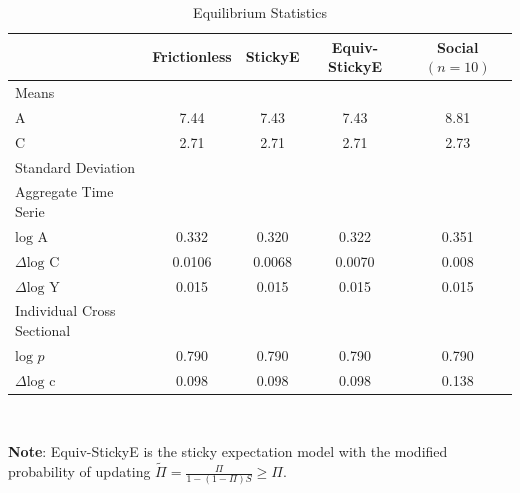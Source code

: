 \documentclass[12pt,letterpaper]{article}
\begin{document}
\begin{table}
	\centering
	\caption{Equilibrium Statistics}
	\label{tab:Uncert}
	\begin{center}
		\begin{tabular}{ l c c c c}\noalign{\hrule height 2pt}
			~ & Frictionless & StickyE & Equiv-StickyE & Social $(n=10)$\\
			\hline
			Means\\ 
			\hspace{6mm}$\mathrm{A}$ & 7.44 & 7.43 & 7.43 & 8.81\\
			\hspace{6mm}$\mathrm{C}$ & 2.71 & 2.71 & 2.71 & 2.73\\
			\hline
			Standard Deviation\\
			\hspace{3mm}Aggregate Time Serie\\
			\hspace{6mm}$\text{log }\mathrm{A}$ & 0.332 & 0.320 & 0.322 & 0.351\\
			\hspace{6mm}$\Delta \text{log }\mathrm{C}$ & 0.0106 & 0.0068 & 0.0070 & 0.008\\
			\hspace{6mm}$\Delta \text{log }\mathrm{Y}$ & 0.015 & 0.015 & 0.015 & 0.015\\
			\hspace{3mm}Individual Cross Sectional\\
			\hspace{6mm}$\text{log }p$ & 0.790 & 0.790 & 0.790& 0.790\\
			\hspace{6mm}$\Delta \text{log }\pmb{\mathrm{c}}$ & 0.098 & 0.098 & 0.098 & 0.138\\									
			\hline
		\end{tabular}
		\\
	\end{center}
	\begin{tablenotes}
		\small
		\item \textbf{Note}: Equiv-StickyE is the sticky expectation model with the modified probability of updating $\tilde{\Pi}=\frac{\Pi}{1-\left(1-\Pi\right)S}\geq\Pi$.
	\end{tablenotes}
\end{table}
\clearpage

\end{document}
